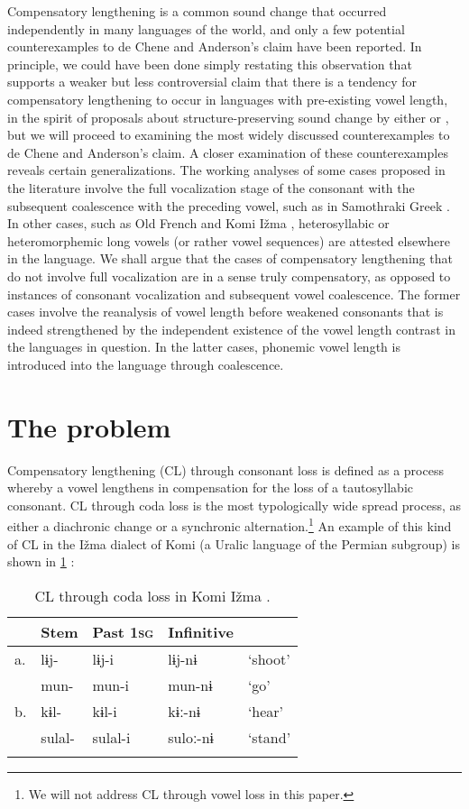 \documentclass[output=paper,
modfonts
]{LSP/langsci}
\begin{document}
Compensatory lengthening is a common sound change that occurred
independently in many languages of the world, and only a few potential
counterexamples to de Chene and Anderson's claim have been reported. In
principle, we could have been done simply restating this observation
that supports a weaker but less controversial claim that there is a
tendency for compensatory lengthening to occur in languages with
pre-existing vowel length, in the spirit of proposals about
structure-preserving sound change by either \citet{kiparsky2003} or \citet{blevins2009k}, but we will proceed to examining the most widely discussed
counterexamples to de Chene and Anderson's claim. A closer examination
of these counterexamples reveals certain generalizations. The working
analyses of some cases proposed in the literature involve the full
vocalization stage of the consonant with the subsequent coalescence with
the preceding vowel, such as in Samothraki Greek \citep{sumner1999,kiparsky2011k}. In other cases, such as Old French \citep{gess1998} and Komi Ižma
\citep{hausenberg1998}, heterosyllabic or heteromorphemic long vowels (or
rather vowel sequences) are attested elsewhere in the language. We shall
argue that the cases of compensatory lengthening that do not involve
full vocalization \citep{hayes1989k,kavitskaya2002} are in a sense truly
compensatory, as opposed to instances of consonant vocalization and
subsequent vowel coalescence. The former cases involve the reanalysis of
vowel length before weakened consonants that is indeed strengthened by
the independent existence of the vowel length contrast in the languages
in question. In the latter cases, phonemic vowel length is introduced
into the language through coalescence.

\section{The problem}

Compensatory lengthening (CL) through consonant loss is defined as a
process whereby a vowel lengthens in compensation for the loss of a
tautosyllabic consonant. CL through coda loss is the most typologically
wide spread process, as either a diachronic change or a synchronic
alternation.\footnote{We will not address CL through vowel loss in this
  paper.} An example of this kind of CL in the Ižma dialect of Komi (a
Uralic language of the Permian subgroup) is shown in
\cref{tab:codalosski} \citep{harms1967,harms1968,deChene1979}:

\begin{table}
\begin{tabular}{lllll}
	\lsptoprule
	&  Stem & Past \textsc{1sg} & Infinitive & \\
	\midrule
	a. & lɨj- & lɨj-i & lɨj-nɨ & `shoot' \\
	& mun- & mun-i & mun-nɨ & `go' \\
	b. & kɨl- & kɨl-i & kɨː-nɨ & `hear' \\
	& sulal- & sulal-i & suloː-nɨ & `stand'\\
	\lspbottomrule
\end{tabular}
\caption{CL through coda loss in Komi Ižma \citep[after][104]{harms1968}.}
\label{tab:codalosski}
\end{table}
\end{document}
